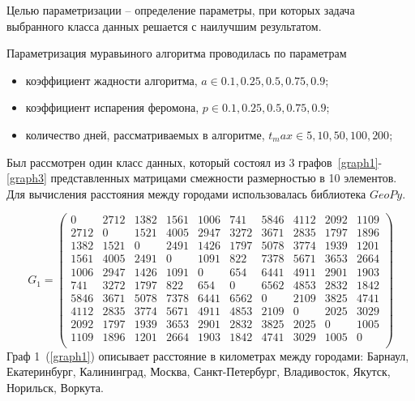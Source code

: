 Целью параметризации -- определение параметры, при которых задача выбранного класса данных решается с наилучшим результатом.

Параметризация муравьиного алгоритма проводилась по параметрам
\begin{itemize}
 	\item коэффициент жадности алгоритма,  $a \in {0.1, 0.25, 0.5, 0.75, 0.9}$;
 	\item коэффициент испарения феромона,  $p \in {0.1, 0.25, 0.5, 0.75, 0.9}$;
 	\item количество дней, рассматриваемых в алгоритме,  $t_max \in {5, 10, 50, 100, 200}$;
\end{itemize}

Был рассмотрен один класс данных, который состоял из 3 графов~\ref{graph1}-\ref{graph3} представленных матрицами смежности размерностью в 10 элементов. Для вычисления расстояния между городами использовалась библиотека $GeoPy$\cite{GeoPy}.

\begin{equation}
	\label{graph1}
	G_{1} = \begin{pmatrix}
		0 & 2712 & 1382 & 1561 & 1006 & 741 & 5846 & 4112 & 2092 & 1109 \\
		2712 & 0 & 1521 & 4005 & 2947 & 3272 & 3671 & 2835 & 1797 & 1896 \\
		1382 & 1521 & 0 & 2491 & 1426 & 1797 & 5078 & 3774 & 1939 & 1201 \\
		1561 & 4005 & 2491 & 0 & 1091 & 822 & 7378 & 5671 & 3653 & 2664 \\
		1006 & 2947 & 1426 & 1091 & 0 & 654 & 6441 & 4911 & 2901 & 1903 \\
		741 & 3272 & 1797 & 822 & 654 & 0 & 6562 & 4853 & 2832 & 1842 \\
		5846 & 3671 & 5078 & 7378 & 6441 & 6562 & 0 & 2109 & 3825 & 4741 \\
		4112 & 2835 & 3774 & 5671 & 4911 & 4853 & 2109 & 0 & 2025 & 3029 \\
		2092 & 1797 & 1939 & 3653 & 2901 & 2832 & 3825 & 2025 & 0 & 1005 \\
		1109 & 1896 & 1201 & 2664 & 1903 & 1842 & 4741 & 3029 & 1005 & 0 \\
	\end{pmatrix}
\end{equation}
Граф 1~(\ref{graph1}) описывает расстояние в километрах между городами: Барнаул, Екатеринбург, Калининград, Москва, Санкт-Петербург, Владивосток, Якутск, Норильск, Воркута.

